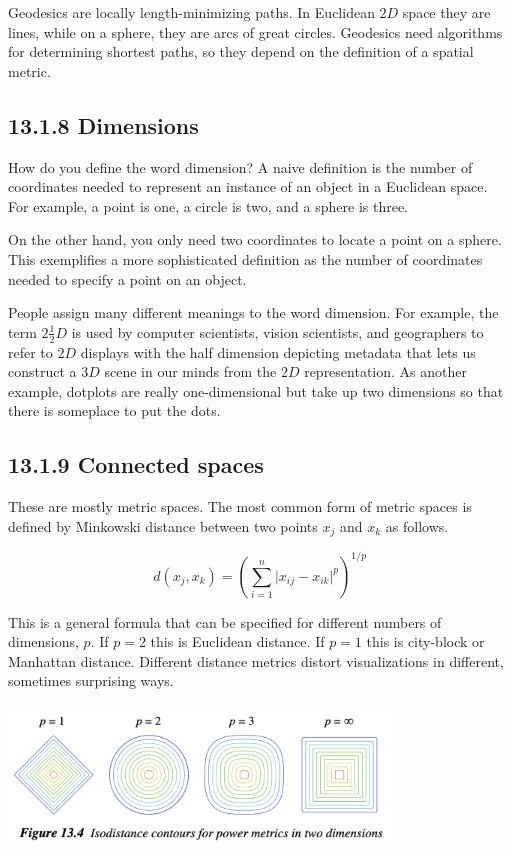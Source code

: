 Geodesics are locally length-minimizing paths. In Euclidean \(2D\) space
they are lines, while on a sphere, they are arcs of great circles.
Geodesics need algorithms for determining shortest paths, so they depend
on the definition of a spatial metric.

\hypertarget{dimensions}{%
\subsection{13.1.8 Dimensions}\label{dimensions}}

How do you define the word dimension? A naive definition is the number
of coordinates needed to represent an instance of an object in a
Euclidean space. For example, a point is one, a circle is two, and a
sphere is three.

On the other hand, you only need two coordinates to locate a point on a
sphere. This exemplifies a more sophisticated definition as the number
of coordinates needed to specify a point on an object.

People assign many different meanings to the word dimension. For
example, the term \(2\frac{1}{2}D\) is used by computer scientists,
vision scientists, and geographers to refer to \(2D\) displays with the
half dimension depicting metadata that lets us construct a \(3D\) scene
in our minds from the \(2D\) representation. As another example,
dotplots are really one-dimensional but take up two dimensions so that
there is someplace to put the dots.

\hypertarget{connected-spaces}{%
\subsection{13.1.9 Connected spaces}\label{connected-spaces}}

These are mostly metric spaces. The most common form of metric spaces is
defined by Minkowski distance between two points \(x_j\) and \(x_k\) as
follows.

\[
d(x_j,x_k)=\left(\sum_{i=1}^n \vert x_{ij}-x_{ik}\vert^p\right)^{1/p}
\]

This is a general formula that can be specified for different numbers of
dimensions, \(p\). If \(p=2\) this is Euclidean distance. If \(p=1\)
this is city-block or Manhattan distance. Different distance metrics
distort visualizations in different, sometimes surprising ways.

\includegraphics[width=4in,height=1.5in]{fiIsodistances.png}

